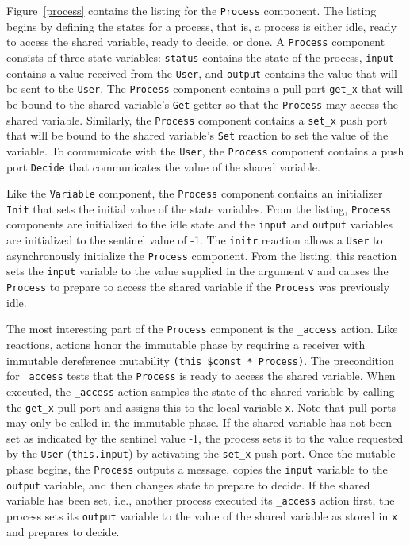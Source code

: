 Figure~\ref{process} contains the listing for the \verb+Process+ component.
The listing begins by defining the states for a process, that is, a process is either idle, ready to access the shared variable, ready to decide, or done.
A \verb+Process+ component consists of three state variables:  \verb+status+ contains the state of the process, \verb+input+ contains a value received from the \verb+User+, and \verb+output+ contains the value that will be sent to the \verb+User+.
The \verb+Process+ component contains a pull port \verb+get_x+ that will be bound to the shared variable's \verb+Get+ getter so that the \verb+Process+ may access the shared variable.
Similarly, the \verb+Process+ component contains a \verb+set_x+ push port that will be bound to the shared variable's \verb+Set+ reaction to set the value of the variable.
To communicate with the \verb+User+, the \verb+Process+ component contains a push port \verb+Decide+ that communicates the value of the shared variable.

Like the \verb+Variable+ component, the \verb+Process+ component contains an initializer \verb+Init+ that sets the initial value of the state variables.
From the listing, \verb+Process+ components are initialized to the idle state and the \verb+input+ and \verb+output+ variables are initialized to the sentinel value of -1.
The \verb+initr+ reaction allows a \verb+User+ to asynchronously initialize the \verb+Process+ component.
From the listing, this reaction sets the \verb+input+ variable to the value supplied in the argument \verb+v+ and causes the \verb+Process+ to prepare to access the shared variable if the \verb+Process+ was previously idle.

The most interesting part of the \verb+Process+ component is the \verb+_access+ action.
Like reactions, actions honor the immutable phase by requiring a receiver with immutable dereference mutability \verb+(this $const * Process)+.
The precondition for \verb+_access+ tests that the \verb+Process+ is ready to access the shared variable.
When executed, the \verb+_access+ action samples the state of the shared variable by calling the \verb+get_x+ pull port and assigns this to the local variable \verb+x+.
Note that pull ports may only be called in the immutable phase.
If the shared variable has not been set as indicated by the sentinel value -1, the process sets it to the value requested by the \verb+User+ (\verb+this.input+) by activating the \verb+set_x+ push port.
Once the mutable phase begins, the \verb+Process+ outputs a message, copies the \verb+input+ variable to the \verb+output+ variable, and then changes state to prepare to decide.
If the shared variable has been set, i.e., another process executed its \verb+_access+ action first, the process sets its \verb+output+ variable to the value of the shared variable as stored in \verb+x+ and prepares to decide.

